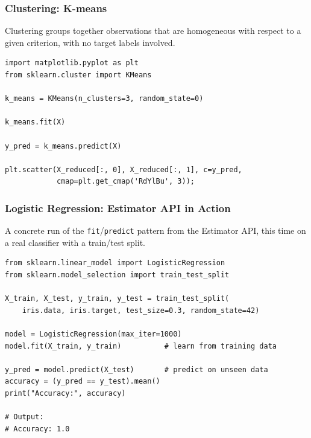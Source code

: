 \begin{frame}[fragile]\frametitle{Clustering: K-means}
Clustering groups together observations that are homogeneous with respect to a given criterion, with no target labels involved.
\begin{lstlisting}
import matplotlib.pyplot as plt
from sklearn.cluster import KMeans

k_means = KMeans(n_clusters=3, random_state=0)

k_means.fit(X)

y_pred = k_means.predict(X)

plt.scatter(X_reduced[:, 0], X_reduced[:, 1], c=y_pred,
            cmap=plt.get_cmap('RdYlBu', 3));
\end{lstlisting}
\end{frame}

\begin{frame}[fragile]\frametitle{Logistic Regression: Estimator API in Action}
A concrete run of the \texttt{fit}/\texttt{predict} pattern from the Estimator API, this time on a real classifier with a train/test split.
\begin{lstlisting}
from sklearn.linear_model import LogisticRegression
from sklearn.model_selection import train_test_split

X_train, X_test, y_train, y_test = train_test_split(
    iris.data, iris.target, test_size=0.3, random_state=42)

model = LogisticRegression(max_iter=1000)
model.fit(X_train, y_train)          # learn from training data

y_pred = model.predict(X_test)       # predict on unseen data
accuracy = (y_pred == y_test).mean()
print("Accuracy:", accuracy)

# Output:
# Accuracy: 1.0
\end{lstlisting}
\end{frame}

